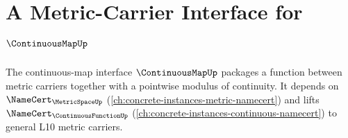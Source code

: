 \chapter{A Metric-Carrier Interface for $\ContinuousMapUp$}
\label{ch:concrete-instances-continuousmap-namecert}

The continuous-map interface $\ContinuousMapUp$ packages a function between
metric carriers together with a pointwise modulus of continuity. It depends on
$\NameCert_{\MetricSpaceUp}$ (\autoref{ch:concrete-instances-metric-namecert})
and lifts $\NameCert_{\ContinuousFunctionUp}$
(\autoref{ch:concrete-instances-continuous-namecert}) to general L10 metric
carriers.










